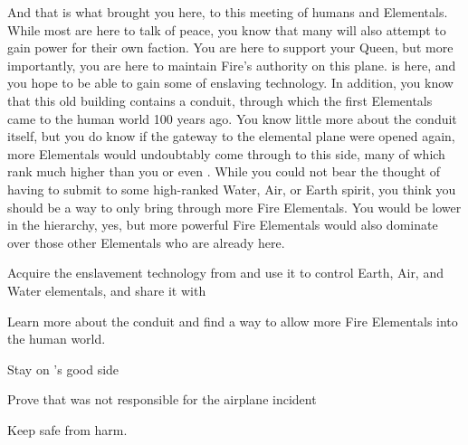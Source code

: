 \documentclass[char]{elementals}
\begin{document}
And that is what brought you here, to this meeting of humans and Elementals.  While most are here to talk of peace, you know that many will also attempt to gain power for their own faction.  You are here to support your Queen, but more importantly, you are here to maintain Fire's authority on this plane.  \cMS{} is here, and you hope to be able to gain some of  enslaving technology.  In addition, you know that this old building contains a conduit, through which the first Elementals came to the human world 100 years ago.  You know little more about the conduit itself, but you do know if the gateway to the elemental plane were opened again, more Elementals would undoubtably come through to this side, many of which rank much higher than you or even \cQueen{}.  While you could not bear the thought of having to submit to some high-ranked Water, Air, or Earth spirit, you think you should be a way to only bring through more Fire Elementals.  You would be lower in the hierarchy, yes, but more powerful Fire Elementals would also dominate over those other Elementals who are already here.  

\begin{itemz}[Goals]
  \item Acquire the enslavement technology from \cMS{} and use it to control Earth, Air, and Water elementals, and share it with \cQueen{}
  \item Learn more about the conduit and find a way to allow more Fire Elementals into the human world.
  \item Stay on \cQueen{}'s good side
  \item Prove that \cJuliet{} was not responsible for the airplane incident 
  \item Keep \cJuliet{} safe from harm.
\end{itemz}
\end{document}
